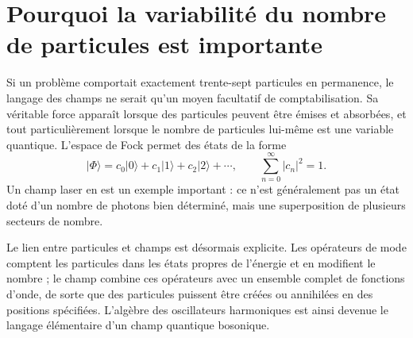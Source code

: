 \begin{classroomqa}
\end{classroomqa}

\begin{classroomqa}
\end{classroomqa}

\section{Pourquoi la variabilité du nombre de particules est importante}

Si un problème comportait exactement trente-sept particules en permanence, le langage des champs ne serait qu’un moyen facultatif de comptabilisation. Sa véritable force apparaît lorsque des particules peuvent être émises et absorbées, et tout particulièrement lorsque le nombre de particules lui-même est une variable quantique. L’espace de Fock permet des états de la forme
\begin{equation}
|\Phi\rangle
=c_0|0\rangle+c_1|1\rangle+c_2|2\rangle+\cdots,
\qquad
\sum_{n=0}^{\infty}|c_n|^2=1.
\end{equation}
Un champ laser en est un exemple important : ce n’est généralement pas un état doté d’un nombre de photons bien déterminé, mais une superposition de plusieurs secteurs de nombre.

Le lien entre particules et champs est désormais explicite. Les opérateurs de mode comptent les particules dans les états propres de l’énergie et en modifient le nombre ; le champ combine ces opérateurs avec un ensemble complet de fonctions d’onde, de sorte que des particules puissent être créées ou annihilées en des positions spécifiées. L’algèbre des oscillateurs harmoniques est ainsi devenue le langage élémentaire d’un champ quantique bosonique.
